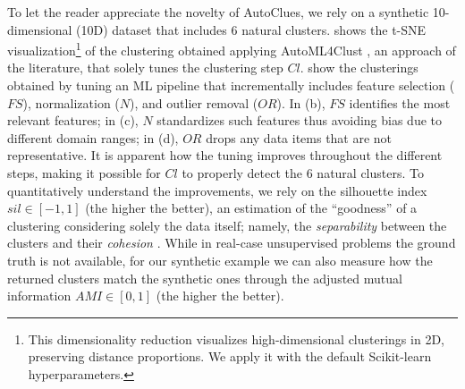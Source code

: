 \documentclass[runningheads]{llncs}
\begin{document}
To let the reader appreciate the novelty of AutoClues, we rely on a synthetic 10-dimensional (10D) dataset that includes 6 natural clusters.  shows the t-SNE \cite{van2008visualizing} visualization\footnote{This dimensionality reduction visualizes high-dimensional clusterings in 2D, preserving distance proportions. We apply it with the default Scikit-learn hyperparameters.}  of the clustering obtained applying AutoML4Clust \cite{Tschechlov2021}, an approach of the literature, that solely tunes the clustering step $Cl$.  show the clusterings obtained by tuning an ML pipeline that incrementally includes feature selection ($FS$), normalization ($N$), and outlier removal ($OR$). In (b), $FS$ identifies the most relevant features; in (c), $N$ standardizes such features thus avoiding bias due to different domain ranges; in (d), $OR$ drops any data items that are not representative. 
It is apparent how the tuning improves throughout the different steps, making it possible for $Cl$ to properly detect the 6 natural clusters. 
To quantitatively understand the improvements, we rely on the silhouette index $sil \in [-1, 1]$ (the higher the better), an estimation of the ``goodness'' of a clustering considering solely the data itself; namely, the \textit{separability} between the clusters and their \textit{cohesion} \cite{zhu2010clustering}.
While in real-case unsupervised problems the ground truth is not available, for our synthetic example we can also measure how the returned clusters match the synthetic ones through the adjusted mutual information \cite{vinh2009information} $AMI \in [0, 1]$ (the higher the better).
\end{document}
